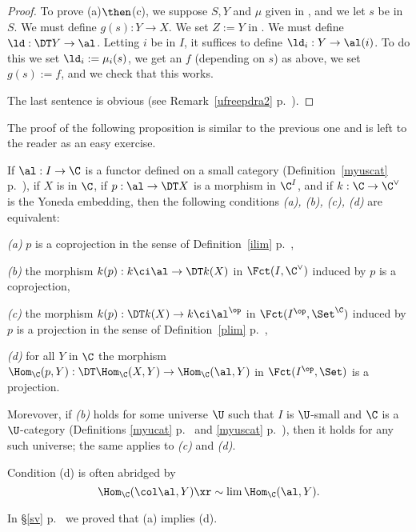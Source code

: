 \documentclass[12pt]{article}
\theoremstyle{remark}
\theoremstyle{definition}
\begin{document}
\begin{s}
\begin{proof}
To prove (a)$\then$(c), we suppose $S,Y$ and $\mu$ given in , and we let $s$ be in $S$. We must define $g(s):Y\to X$. We set $Z:=Y$ in . We must define $\ld:\DT Y\to\al$. Letting $i$ be in $I$, it suffices to define $\ld_i:Y\to\al(i)$. To do this we set $\ld_i:=\mu_i(s)$, we get an $f$ (depending on $s$) as above, we set $g(s):=f$, and we check that this works.

The last sentence is obvious (see Remark~\ref{ufreepdra2} p.~).
\end{proof}

The proof of the following proposition is similar to the previous one and is left to the reader as an easy exercise.

\begin{prop}
If $\al:I\to\C$ is a functor defined on a small category (Definition~\ref{myuscat} p.~), if $X$ is in $\C$, if $p:\al\to\DT X$ is a morphism in $\C^I$, and if $k:\C\to\C^\vee$ is the Yoneda embedding, then the following conditions \emph{(a), (b), (c), (d)} are equivalent:

\nn\emph{(a)} $p$ is a coprojection in the sense of Definition~\ref{ilim} p.~,

\nn\emph{(b)} the morphism $k(p):k\ci\al\to\DT k(X)$ in $\Fct(I,\C^\vee)$ induced by $p$ is a coprojection,

\nn\emph{(c)} the morphism $k(p):\DT k(X)\to k\ci\al^{\op}$ in $\Fct(I^{\op},\Set^\C)$ induced by $p$ is a projection in the sense of Definition~\ref{plim} p.~,

\nn\emph{(d)} for all $Y$ in $\C$ the morphism $\Hom_\C(p,Y):\DT\Hom_\C(X,Y)\to\Hom_\C(\al,Y)$ in $\Fct(I^{\op},\Set)$ is a projection.

\nn Morevover, if \emph{(b)} holds for some universe $\U$ such that $I$ is $\U$-small and $\C$ is a $\U$-category (Definitions \ref{myucat} p.~ and \ref{myuscat} p.~), then it holds for any such universe; the same applies to \emph{(c)} and \emph{(d)}.
\end{prop}

Condition (d) is often abridged by 
$$
\Hom_\C(\col\al,Y)\xr\sim\lim\Hom_\C(\al,Y).
$$ 

In \S\ref{sv} p.~ we proved that (a) implies (d).
\end{s}


\end{document}
